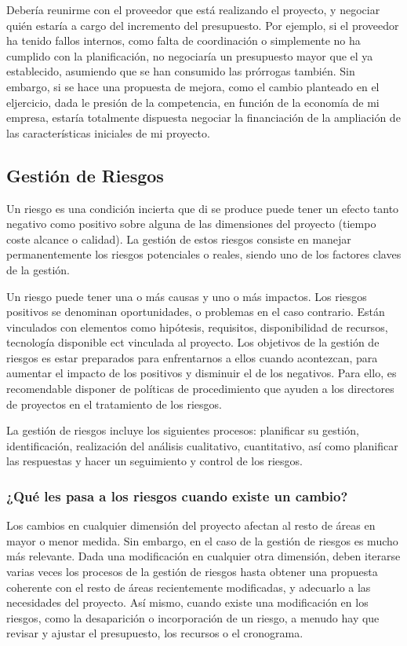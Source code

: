 \documentclass{article}
\begin{document}
Debería reunirme con el proveedor que está realizando el proyecto, y negociar quién estaría a cargo del incremento del presupuesto. Por ejemplo, si el proveedor ha tenido fallos internos, como falta de coordinación o simplemente no ha cumplido con la planificación, no negociaría un presupuesto mayor que el ya establecido, asumiendo que se han consumido las prórrogas también. Sin embargo, si se hace una propuesta de mejora, como el cambio planteado en el eljercicio, dada le presión de la competencia, en función de la economía de mi empresa, estaría totalmente dispuesta negociar la financiación de la ampliación de las características iniciales de mi proyecto.

\subsection{Gestión de Riesgos}
Un riesgo es una condición incierta que di se produce puede tener un efecto tanto negativo como positivo sobre alguna de las dimensiones del proyecto (tiempo coste alcance o calidad). La gestión de estos riesgos consiste en manejar permanentemente los riesgos potenciales o reales, siendo uno de los factores claves de la gestión.

Un riesgo puede tener una o más causas y uno o más impactos. Los riesgos positivos se denominan oportunidades, o problemas en el caso contrario. Están vinculados con elementos como hipótesis, requisitos, disponibilidad de recursos, tecnología disponible ect vinculada al proyecto. Los objetivos de la gestión de riesgos es estar preparados para enfrentarnos a ellos cuando acontezcan, para aumentar el impacto de los positivos y disminuir el de los negativos. Para ello, es recomendable disponer de políticas de procedimiento que ayuden a los directores de proyectos en el tratamiento de los riesgos. 

La gestión de riesgos incluye los siguientes procesos: planificar su gestión, identificación, realización del análisis cualitativo, cuantitativo, así como planificar las respuestas y hacer un seguimiento y control de los riesgos.

\subsubsection{¿Qué les pasa a los riesgos cuando existe un cambio?}

Los cambios en cualquier dimensión del proyecto afectan al resto de áreas en mayor o menor medida. Sin embargo, en el caso de la gestión de riesgos es mucho más relevante. Dada una modificación en cualquier otra dimensión, deben iterarse varias veces los procesos de la gestión de riesgos hasta obtener una propuesta coherente con el resto de áreas recientemente modificadas, y adecuarlo a las necesidades del proyecto. Así mismo, cuando existe una modificación en los riesgos, como la desaparición o incorporación de un riesgo, a menudo hay que revisar y ajustar el presupuesto, los recursos o el cronograma.
\end{document}
